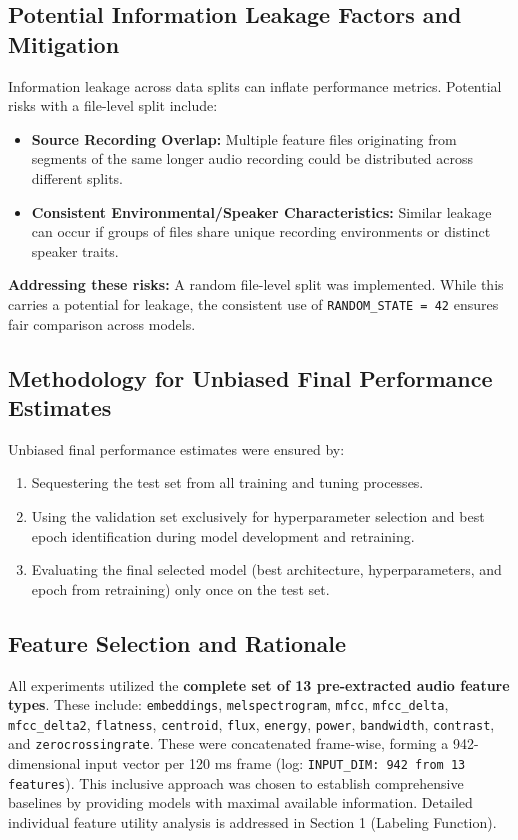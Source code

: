 \documentclass{article}
\newcommand{\code}[1]{\texttt{#1}}
\begin{document}
\subsection{Potential Information Leakage Factors and Mitigation}
Information leakage across data splits can inflate performance metrics. Potential risks with a file-level split include:
\begin{itemize}
    \item \textbf{Source Recording Overlap:} Multiple feature files originating from segments of the same longer audio recording could be distributed across different splits.
    \item \textbf{Consistent Environmental/Speaker Characteristics:} Similar leakage can occur if groups of files share unique recording environments or distinct speaker traits.
\end{itemize}
\textbf{Addressing these risks:} A random file-level split was implemented. While this carries a potential for leakage, the consistent use of \code{RANDOM\_STATE = 42} ensures fair comparison across models.

\subsection{Methodology for Unbiased Final Performance Estimates}
Unbiased final performance estimates were ensured by:
\begin{enumerate}
    \item Sequestering the test set from all training and tuning processes.
    \item Using the validation set exclusively for hyperparameter selection and best epoch identification during model development and retraining.
    \item Evaluating the final selected model (best architecture, hyperparameters, and epoch from retraining) only once on the test set.
\end{enumerate}

\subsection{Feature Selection and Rationale}

All experiments utilized the \textbf{complete set of 13 pre-extracted audio feature types}. These include: \texttt{embeddings}, \texttt{melspectrogram}, \texttt{mfcc}, \texttt{mfcc\_delta}, \texttt{mfcc\_delta2}, \texttt{flatness}, \texttt{centroid}, \texttt{flux}, \texttt{energy}, \texttt{power}, \texttt{bandwidth}, \texttt{contrast}, and \texttt{zerocrossingrate}. These were concatenated frame-wise, forming a 942-dimensional input vector per 120 ms frame (log: \texttt{INPUT\_DIM: 942 from 13 features}). This inclusive approach was chosen to establish comprehensive baselines by providing models with maximal available information. Detailed individual feature utility analysis is addressed in Section 1 (Labeling Function).
\end{document}
